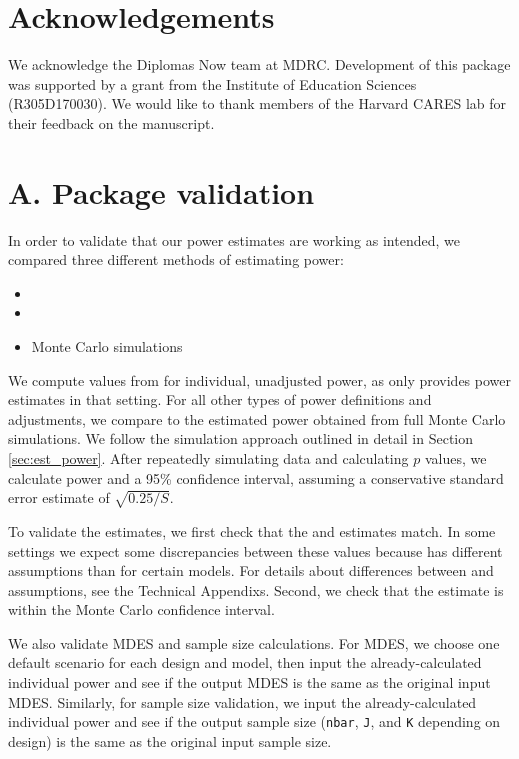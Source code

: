 \documentclass[
]{jss}
\begin{document}
\section*{Acknowledgements}

We acknowledge the Diplomas Now team at MDRC. Development of this
package was supported by a grant from the Institute of Education
Sciences (R305D170030). We would like to thank members of the Harvard
CARES lab for their feedback on the manuscript.



\newpage

\section*{A. Package validation}

In order to validate that our power estimates are working as intended,
we compared three different methods of estimating power:

\begin{itemize}
\item
\item
\item
  Monte Carlo simulations
\end{itemize}

We compute values from  for individual, unadjusted power,
as  only provides power estimates in that setting. For all
other types of power definitions and adjustments, we compare 
to the estimated power obtained from full Monte Carlo simulations. We
follow the simulation approach outlined in detail in Section
\ref{sec:est_power}. After repeatedly simulating data and calculating
\(p\) values, we calculate power and a 95\% confidence interval,
assuming a conservative standard error estimate of \(\sqrt{0.25/S}\).

To validate the estimates, we first check that the  and
 estimates match. In some settings we expect some
discrepancies between these values because  has different
assumptions than  for certain models. For details about
differences between  and  assumptions, see the
Technical Appendixs. Second, we check that the  estimate is
within the Monte Carlo confidence interval.

We also validate MDES and sample size calculations. For MDES, we choose
one default scenario for each design and model, then input the
already-calculated individual power and see if the output MDES is the
same as the original input MDES. Similarly, for sample size validation,
we input the already-calculated individual power and see if the output
sample size (\texttt{nbar}, \texttt{J}, and \texttt{K} depending on
design) is the same as the original input sample size.
\end{document}
